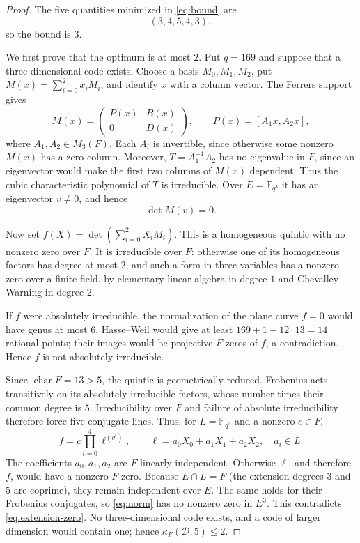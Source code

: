 \documentclass[11pt,reqno]{amsart}
\numberwithin{equation}{section}
\begin{document}
\begin{proof}
The five quantities minimized in \eqref{eq:bound} are
\[
 (3,4,5,4,3),
\]
so the bound is $3$.

We first prove that the optimum is at most $2$.  Put $q=169$ and suppose
that a three-dimensional code exists.  Choose a basis $M_0,M_1,M_2$, put
$M(x)=\sum_{i=0}^2x_iM_i$, and identify $x$ with a column vector.  The
Ferrers support gives
\[
 M(x)=\begin{pmatrix}P(x)&B(x)\\0&D(x)\end{pmatrix},
 \qquad P(x)=[A_1x,A_2x],
\]
where $A_1,A_2\in M_3(F)$.  Each $A_i$ is invertible, since otherwise
some nonzero $M(x)$ has a zero column.  Moreover,
$T=A_1^{-1}A_2$ has no eigenvalue in $F$, since an eigenvector would make
the first two columns of $M(x)$ dependent.  Thus the cubic characteristic
polynomial of $T$ is irreducible.  Over $E=\mathbb F_{q^3}$ it has an
eigenvector $v\ne0$, and hence
\begin{equation}
 \det M(v)=0.
 \label{eq:extension-zero}
\end{equation}

Now set $f(X)=\det(\sum_{i=0}^2X_iM_i)$.  This is a homogeneous quintic
with no nonzero zero over $F$.  It is irreducible over $F$: otherwise one
of its homogeneous factors has degree at most $2$, and such a form in
three variables has a nonzero zero over a finite field, by elementary
linear algebra in degree $1$ and Chevalley--Warning in degree $2$.

If $f$ were absolutely irreducible, the normalization of the plane curve
$f=0$ would have genus at most $6$.  Hasse--Weil would give at least
$169+1-12\cdot13=14$ rational points; their images
would be projective $F$-zeros of $f$, a contradiction.  Hence $f$ is not
absolutely irreducible.

Since $\operatorname{char}F=13>5$, the quintic is geometrically reduced.
Frobenius acts transitively on its absolutely irreducible factors, whose
number times their common degree is $5$.  Irreducibility over $F$ and
failure of absolute irreducibility therefore force five conjugate lines.
Thus, for $L=\mathbb F_{q^5}$ and a nonzero $c\in F$,
\begin{equation}
 f=c\prod_{i=0}^4\ell^{(q^i)},
 \qquad
 \ell=a_0X_0+a_1X_1+a_2X_2,\quad a_i\in L.
 \label{eq:norm}
\end{equation}
The coefficients $a_0,a_1,a_2$ are $F$-linearly independent.  Otherwise
$\ell$, and therefore $f$, would have a nonzero $F$-zero.  Because
$E\cap L=F$ (the extension degrees $3$ and $5$ are coprime), they remain
independent over $E$.  The same holds for their Frobenius conjugates, so
\eqref{eq:norm} has no nonzero zero in $E^3$.  This contradicts
\eqref{eq:extension-zero}.  No three-dimensional code exists, and a code
of larger dimension would contain one; hence
$\kappa_F(\mathcal D,5)\le2$.


\end{proof}
\end{document}
